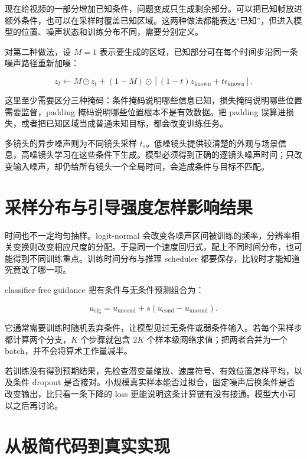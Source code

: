 现在给视频的一部分增加已知条件，问题变成只生成剩余部分。可以把已知帧放进额外条件，也可以在采样时覆盖已知区域。这两种做法都能表达“已知”，但进入模型的位置、噪声状态和训练分布不同，需要分别定义。

对第二种做法，设 \(M=1\) 表示要生成的区域，已知部分可在每个时间步沿同一条噪声路径重新加噪：

\[
z_t\leftarrow M\odot z_t+(1-M)\odot
\left[(1-t)z_{\mathrm{known}}+t\epsilon_{\mathrm{known}}\right].
\]

这里至少需要区分三种掩码：条件掩码说明哪些信息已知，损失掩码说明哪些位置需要监督，padding 掩码说明哪些位置根本不是有效数据。把 padding 误算进损失，或者把已知区域当成普通未知目标，都会改变训练任务。

多镜头的异步噪声则为不同镜头采样 \(t_s\)。低噪镜头提供较清楚的外观与场景信息，高噪镜头学习在这些条件下生成。模型必须得到正确的逐镜头噪声时间；只改变输入噪声，却仍给所有镜头一个全局时间，会造成条件与目标不匹配。

\section{采样分布与引导强度怎样影响结果}\label{seedance-m02-ux91c7ux6837ux5206ux5e03ux4e0eux5f15ux5bfcux5f3aux5ea6ux600eux6837ux5f71ux54cdux7ed3ux679c}

时间也不一定均匀抽样。logit-normal 会改变各噪声区间被训练的频率，分辨率相关变换则改变相应尺度的分配。于是同一个速度回归式，配上不同时间分布，也可能得到不同训练重点。训练时间分布与推理 scheduler 都要保存，比较时才能知道究竟改了哪一项。

classifier-free guidance 把有条件与无条件预测组合为：

\[
u_{\mathrm{cfg}}=u_{\mathrm{uncond}}+
s\left(u_{\mathrm{cond}}-u_{\mathrm{uncond}}\right).
\]

它通常需要训练时随机丢弃条件，让模型见过无条件或弱条件输入。若每个采样步都计算两个分支，\(K\) 个步骤就包含 \(2K\) 个样本级网络求值；把两者合并为一个 batch，并不会将算术工作量减半。

若训练没有得到预期结果，先检查潜变量缩放、速度符号、有效位置怎样平均，以及条件 dropout 是否接对。小规模真实样本能否过拟合，固定噪声后换条件是否改变输出，比只看一条下降的 loss 更能说明这条计算链有没有接通。模型大小可以之后再讨论。

\section{从极简代码到真实实现}\label{seedance-m02-ux4eceux6781ux7b80ux4ee3ux7801ux5230ux771fux5b9eux5b9eux73b0}

